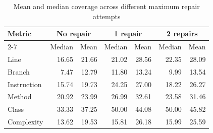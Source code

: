 \begin{table}[htbp]
\centering
\caption{Mean and median coverage across different maximum repair attempts}
\label{tab:coverage-repair-attempts}
\begin{tabular}{lrrrrrr}
\hline
Metric & \multicolumn{2}{c}{No repair} & \multicolumn{2}{c}{1 repair} & \multicolumn{2}{c}{2 repairs} \\
\cline{2-7}
 & Median & Mean & Median & Mean & Median & Mean \\
\hline
Line & 16.65 & 21.66 & 21.02 & 28.56 & 22.35 & 28.09 \\
Branch & 7.47 & 12.79 & 11.80 & 13.24 & 9.99 & 13.54 \\
Instruction & 15.74 & 19.73 & 24.25 & 27.00 & 18.22 & 26.27 \\
Method & 20.92 & 23.99 & 26.99 & 32.61 & 23.58 & 31.46 \\
Class & 33.33 & 37.25 & 50.00 & 44.08 & 50.00 & 45.82 \\
Complexity & 13.62 & 19.53 & 15.81 & 26.18 & 15.99 & 25.59 \\
\hline
\end{tabular}
\end{table}